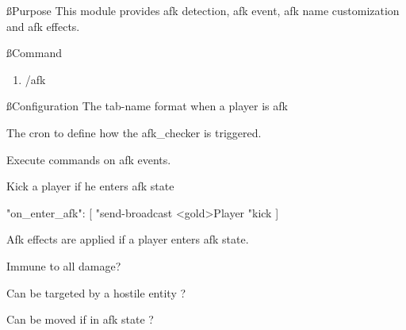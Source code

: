 
\ss{Purpose}
This module provides afk detection, afk event, afk name customization and afk effects.

\ss{Command}
\begin{enumerate}
    \item /afk
\end{enumerate}

\ss{Configuration}
The tab-name format when a player is afk

The cron to define how the afk\_checker is triggered.

Execute commands on afk events.

\begin{example}{Kick a player if he enters afk state}
    \begin{json}
        "on_enter_afk": [
        "send-broadcast <gold>Player %
        "kick %
        ]
    \end{json}
\end{example}

Afk effects are applied if a player enters afk state.

Immune to all damage?

Can be targeted by a hostile entity ?

Can be moved if in afk state ?












